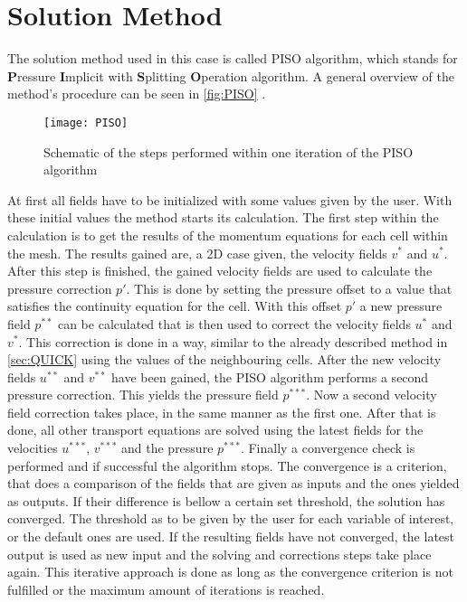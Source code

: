 \documentclass[../thesis.tex]{subfiles}
\begin{document}
\section{Solution Method}
\label{sec:sol_method}

The solution method used in this case is called PISO algorithm, which stands for \textbf{P}ressure \textbf{I}mplicit with \textbf{S}plitting \textbf{O}peration algorithm. A general overview of the method's procedure can be seen in \autoref{fig:PISO} \cite{versteeg2007introduction}.

\begin{figure}[htbp]
	\centering
	\texttt{[image: PISO]}
	\caption{Schematic of the steps performed within one iteration of the PISO algorithm}
	\label{fig:PISO}
\end{figure}

At first all fields have to be initialized with some values given by the user. With these initial values the method starts its calculation. The first step within the calculation is to get the results of the momentum equations for each cell within the mesh. The results gained are, a 2D case given, the velocity fields $v^*$ and $u^*$. After this step is finished, the gained velocity fields are used to calculate the pressure correction $p'$. This is done by setting the pressure offset to a value that satisfies the continuity equation for the cell. With this offset $p'$ a new pressure field $p^{**}$ can be calculated that is then used to correct the velocity fields $u^*$ and $v^*$. This correction is done in a way, similar to the already described method in \autoref{sec:QUICK} using the values of the neighbouring cells. After the new velocity fields $u^{**}$ and $v^{**}$ have been gained, the PISO algorithm performs a second pressure correction. This yields the pressure field $p^{***}$. Now a second velocity field correction takes place, in the same manner as the first one. After that is done, all other transport equations are solved using the latest fields for the velocities $u^{***}$, $v^{***}$ and the pressure $p^{***}$. Finally a convergence check is performed and if successful the algorithm stops. The convergence is a criterion, that does a comparison of the fields that are given as inputs and the ones yielded as outputs. If their difference is bellow a certain set threshold, the solution has converged. The threshold as to be given by the user for each variable of interest, or the default ones are used. If the resulting fields have not converged, the latest output is used as new input and the solving and corrections steps take place again. This iterative approach is done as long as the convergence criterion is not fulfilled or the maximum amount of iterations is reached.
\end{document}
